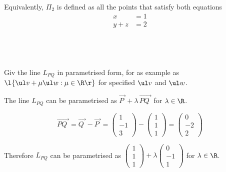 \documentclass[a4paper]{article}
\begin{document}
Equivalently, $\Pi_2$ is defined as all the points that satisfy both equations \begin{align*}
x &= 1\\
y + z &= 2
\end{align*}

\subsection{~} %

\begin{questionbody}
Giv the line $L_{PQ}$ in parametrised form, for as example as $\l\{ \ul v + \mu \ul w : \mu \in \R \r\}$ for specified $\ul v$ and $\ul w$.
\end{questionbody}

The line $L_{PQ}$ can be parametrised as $\overrightarrow{P\;} + \lambda\, \overrightarrow{PQ\;}$ for $\lambda \in \R$.

$$\overrightarrow{PQ\;} = \overrightarrow{Q\;} - \overrightarrow{P\;} = \begin{pmatrix}1\\ -1\\ 3\end{pmatrix} - \begin{pmatrix}1\\ 1\\ 1\end{pmatrix} = \begin{pmatrix}0\\ -2\\ 2\end{pmatrix}$$

Therefore $L_{PQ}$ can be parametrised as $\begin{pmatrix}1\\ 1\\ 1\end{pmatrix} + \lambda \begin{pmatrix}0\\ -1\\ 1\end{pmatrix}$ for $\lambda \in \R$.
\end{document}
